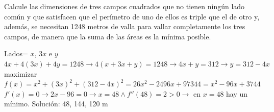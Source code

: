 \documentclass[addpoints,spanish, 12pt,a4paper]{exam}
\begin{document}
\begin{questions}


\question[3] Calcule las dimensiones de tres campos cuadrados que no tienen ningún lado común y que
satisfacen que el perímetro de uno de ellos es triple que el de otro y, además, se necesitan 1248 metros de
valla para vallar completamente los tres campos, de manera que la suma de las áreas es la mínima posible.
\begin{solution}
    Lados= $x$, $3x$ e $y$ \\
    $4x+4(3x)+4y=1248 \to 4(x+3x+y)=1248 \to 4x+y=312 \to y=312-4x$ \\
    maximizar $f(x)=x^2+(3x)^2+(312-4x)^2=26 x^{2} - 2496 x + 97344= x^{2} - 96 x + 3744$ \\
    $f'(x)=0 \to 2x-96=0 \to x=48 \land f''(48)=2>0 \to$ en $x=48$ hay un mínimo.
    Solución: 48, 144, 120 m  
    
\end{solution}
\addpoints

\end{questions}
\end{document}
